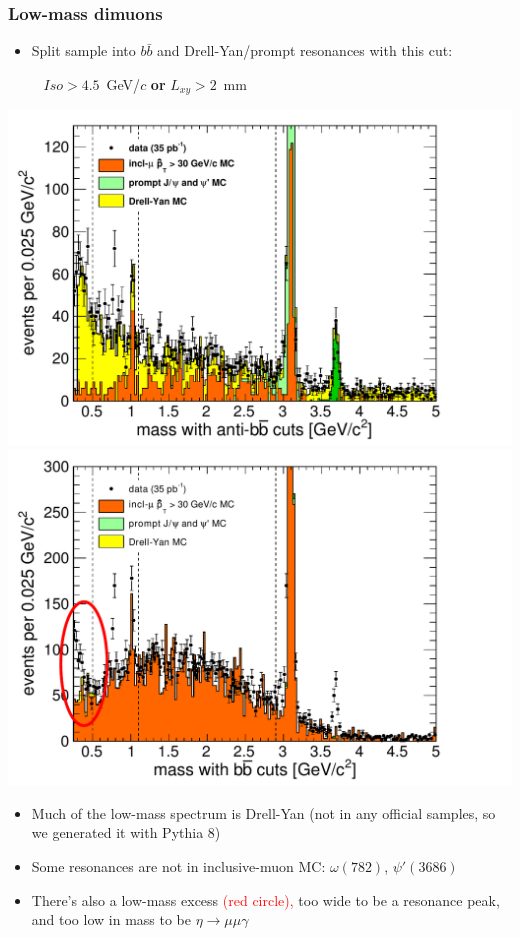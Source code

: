 \documentclass[compress]{beamer}
\begin{document}
\begin{frame}
\frametitle{Low-mass dimuons}

\begin{itemize}
\item Split sample into $b\bar{b}$ and Drell-Yan/prompt resonances with this cut:

\mbox{ } \hfill $Iso > 4.5$~GeV/$c$ {\bf or} $L_{xy} > 2$~mm \hfill \mbox{ }
\label{pag:bbcuts}
\end{itemize}

\includegraphics[width=0.5\linewidth]{support_mass_antibbbar.pdf}
\includegraphics[width=0.5\linewidth]{support_mass_bbbar.pdf}

\begin{itemize}
\item Much of the low-mass spectrum is Drell-Yan (not in any official samples, so we generated it with Pythia 8)
\item Some resonances are not in inclusive-muon MC: $\omega(782)$, $\psi'(3686)$
\item There's also a low-mass excess \textcolor{red}{(red circle),} too wide to be a resonance peak, and too low in mass to be $\eta \to \mu\mu\gamma$
\end{itemize}
\end{frame}
\end{document}
